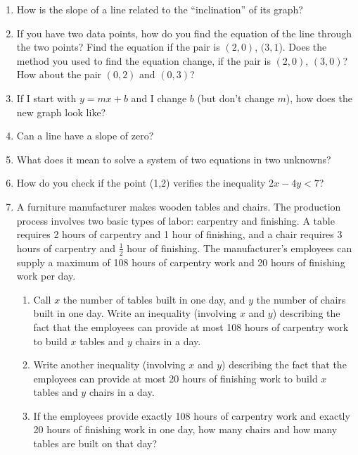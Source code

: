 \documentclass[11pt,dvipsnames]{article}
\begin{document}
\thispagestyle{empty}
\begin{enumerate}[label=$\blacktriangleright$ {\bf  \arabic*:}]
\item How is the slope of a line related to the “inclination” of its graph?

\item If you have two data points, how do you find the equation of the line through the two points? Find the equation if the pair is $(2,0)$, $(3,1$).  Does the method you used to find the equation change, if the pair is $(2,0)$, $(3,0)$? How about the pair $(0,2)$ and $(0,3)$?

\item If I start with $y = mx + b$ and I change $b$ (but don’t change $m$), how does the new graph look like?

\item Can a line have a slope of zero?

\item What does it mean to solve a system of two equations in two unknowns?

\item How do you check if the point (1,2) verifies the inequality  $2x-4y<7$?



\item A furniture manufacturer makes wooden tables and chairs. The production process involves two basic types of labor: carpentry and finishing. A table requires 2 hours of carpentry and 1 hour of finishing, and a chair requires 3 hours of carpentry and $\displaystyle \frac{1}{2}$ hour of finishing.  The manufacturer's employees can supply a maximum of 108 hours of carpentry work and 20 hours of finishing work per day. 
\begin{enumerate}[label=$\diamondsuit$ {\bf  \arabic*:}]
\item Call $x$ the number of tables built in one day, and $y$ the number of chairs built in one day. Write an inequality (involving $x$ and $y$) describing the fact that the employees can provide at most 108 hours of carpentry work to build $x$ tables and $y$ chairs in a day.
\item  Write another inequality (involving $x$ and $y$) describing the fact that the employees can provide at most 20 hours of finishing work to build $x$ tables and $y$ chairs in a day.
\item If the employees provide exactly 108 hours of carpentry work and exactly 20 hours of finishing work in one day, how many chairs and how many tables are built on that day?
\end{enumerate}
\end{enumerate}
\end{document}
